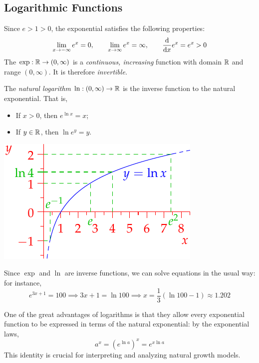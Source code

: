 \clearpage



\subsection{Logarithmic Functions}

Since $e>1>0$, the exponential satisfies the following properties:
\[\lim_{x\to-\infty}e^x=0,\qquad \lim_{x\to\infty}e^x=\infty,\qquad \frac{\mathrm{d} }{\mathrm{d} x}e^x=e^x>0\]
The $\exp:\mathbb{R}\to(0,\infty)$ is a \emph{continuous, increasing} function with domain $\mathbb{R}$ and range $(0,\infty)$. It is therefore \emph{invertible.}


\begin{defn}[lower separated=false, sidebyside, sidebyside align=top seam, sidebyside gap=0pt, righthand width=0.4\linewidth]{}{}
The \emph{natural logarithm} $\ln:(0,\infty)\to\mathbb{R}$ is the inverse function to the natural exponential. That is,
\begin{itemize}
	\item If $x>0$, then $e^{\ln x}=x$;
	\item If $y\in\mathbb{R}$, then $\ln e^y=y$.
\end{itemize}
\tcblower
\flushright\includegraphics{log}
\end{defn}

Since $\exp$ and $\ln$ are inverse functions, we can solve equations in the usual way: for instance,
\[e^{3x+1}=100 \implies 3x+1=\ln 100\implies x=\frac 13(\ln 100-1) \approx 1.202\]



One of the great advantages of logarithms is that they allow every exponential function to be expressed in terms of the natural exponential: by the exponential laws,
\[a^x=(e^{\ln a})^x=e^{x\ln a}\]
This identity is crucial for interpreting and analyzing natural growth models.



